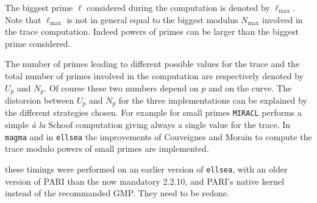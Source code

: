 \documentclass[11pt]{article}
\def\ellsea{\texttt{ellsea}\xspace}
\def\MIRACL{\texttt{MIRACL}\xspace}
\def\magma{\texttt{magma}\xspace}
\begin{document}
The biggest prime $\ell$ considered during the computation is denoted by
$\ell_\textrm{max}$. Note that $\ell_\textrm{max}$ is not in general equal to
the biggest modulus $N_\textrm{max}$ involved in the trace computation.
Indeed powers of primes can be larger than the biggest prime considered.

The number of primes leading to different possible values for the trace and
the total number of primes involved in the computation are respectively
denoted by $U_p$ and $N_p$. Of course these two numbers depend on $p$ and on
the curve. The distorsion between $U_p$ and $N_p$ for the three
implementations can be explained by the different strategies chosen. For
example for small primes \MIRACL performs a simple \emph{\`a la} Schoof
computation giving always a single value for the trace.  In \magma and
in \ellsea the improvements of Couveignes and Morain to compute the
trace modulo powers of small primes are implemented.

 these timings were performed on an earlier
version of \ellsea, with an older version of PARI than the now mandatory
2.2.10, and PARI's native kernel instead of the recommanded GMP. They need to
be redone.
\end{document}
